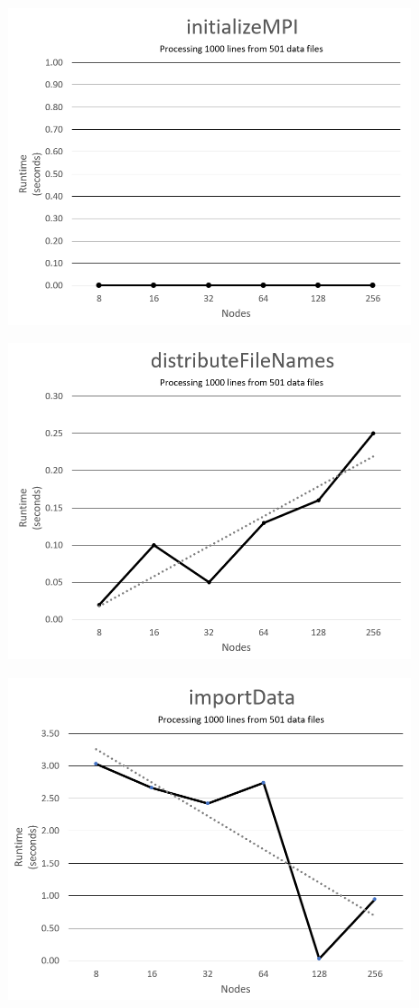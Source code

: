 \includegraphics[width=0.8\textwidth]{initializeMPI.png}

\includegraphics[width=0.8\textwidth]{distributeFileNames.png}

\includegraphics[width=0.8\textwidth]{importData.png}

